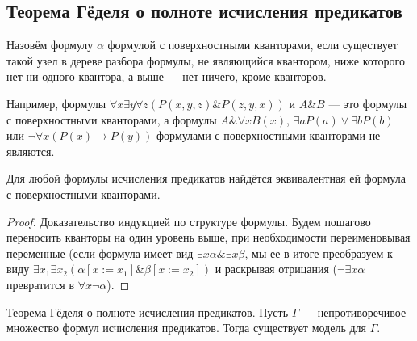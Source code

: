 \subsection{Теорема Гёделя о полноте исчисления предикатов}

\begin{definition}
Назовём формулу $\alpha$ формулой с поверхностными кванторами,
если существует такой узел в дереве разбора формулы, не являющийся
квантором, ниже которого нет ни одного квантора, а выше --- 
нет ничего, кроме кванторов.
\end{definition}

Например, формулы $\forall x \exists y \forall z (P(x,y,z) \& P(z,y,x))$ и 
$A \& B$ --- это формулы с поверхностными кванторами, а формулы 
$A \& \forall x B(x)$, $\exists a P(a) \vee \exists b P(b)$
или $\neg \forall x (P (x) \rightarrow P(y))$
формулами с поверхностными кванторами не являются.

\begin{lemma}
Для любой формулы исчисления предикатов найдётся эквивалентная
ей формула с поверхностными кванторами.
\end{lemma}

\begin{proof}Доказательство индукцией по структуре формулы.
Будем пошагово переносить кванторы на один уровень выше, при 
необходимости переименовывая переменные (если формула имеет вид
$\exists x \alpha \& \exists x \beta$, мы ее в итоге преобразуем к виду
$\exists x_1 \exists x_2 (\alpha [x := x_1] \& \beta [x := x_2])$ 
и раскрывая отрицания
($\neg \exists x \alpha$ превратится в $\forall x \neg \alpha$).
\end{proof}

\begin{theorem}{Теорема Гёделя о полноте исчисления предикатов.}
Пусть $\Gamma$ --- непротиворечивое множество формул исчисления предикатов.
Тогда существует модель для $\Gamma$.
\end{theorem}

